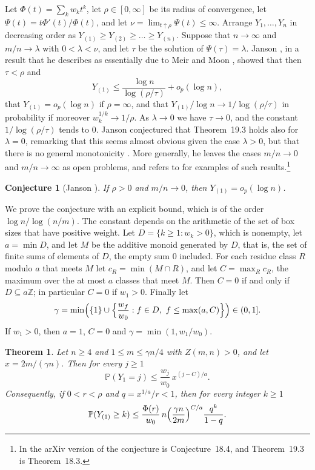 \documentclass[11pt]{amsart}
\newtheorem{theorem}{Theorem}[section]
\newtheorem*{conjecture*}{Conjecture}
\theoremstyle{remark}
\numberwithin{equation}{section}
\newcommand{\Pp}{\mathbb P}
\newcommand{\Z}{\mathbb Z}
\begin{document}
Let $\Phi(t)=\sum_kw_kt^k$, let $\rho\in[0,\infty]$ be its radius of convergence, let $\Psi(t)=t\Phi'(t)/\Phi(t)$, and let $\nu=\lim_{t\uparrow\rho}\Psi(t)\le\infty$. Arrange $Y_1,\dots,Y_n$ in decreasing order as $Y_{(1)}\ge Y_{(2)}\ge\dots\ge Y_{(n)}$. Suppose that $n\to\infty$ and $m/n\to\lambda$ with $0<\lambda<\nu$, and let $\tau$ be the solution of $\Psi(\tau)=\lambda$. Janson \cite[Theorem~19.3]{J12}, in a result that he describes as essentially due to Meir and Moon \cite{MM90}, showed that then $\tau<\rho$ and
\[
Y_{(1)}\le\frac{\log n}{\log(\rho/\tau)}+o_p(\log n),
\]
that $Y_{(1)}=o_p(\log n)$ if $\rho=\infty$, and that $Y_{(1)}/\log n\to1/\log(\rho/\tau)$ in probability if moreover $w_k^{1/k}\to1/\rho$. As $\lambda\to0$ we have $\tau\to0$, and the constant $1/\log(\rho/\tau)$ tends to $0$. Janson conjectured that Theorem~19.3 holds also for $\lambda=0$, remarking that this seems almost obvious given the case $\lambda>0$, but that there is no general monotonicity \cite[Section~19.1]{J12}. More generally, he leaves the cases $m/n\to0$ and $m/n\to\infty$ as open problems, and refers to \cite{KSC78,Kol86,Pav00,Kaz02} for examples of such results.\footnote{In the arXiv version of \cite{J12} the conjecture is Conjecture~18.4, and Theorem~19.3 is Theorem~18.3.}

\begin{conjecture*}[{Janson \cite[Conjecture~19.4]{J12}}]
If $\rho>0$ and $m/n\to0$, then $Y_{(1)}=o_p(\log n)$.
\end{conjecture*}

We prove the conjecture with an explicit bound, which is of the order $\log n/\log(n/m)$. The constant depends on the arithmetic of the set of box sizes that have positive weight. Let $D=\{k\ge1:w_k>0\}$, which is nonempty, let $a=\min D$, and let $M$ be the additive monoid generated by $D$, that is, the set of finite sums of elements of $D$, the empty sum $0$ included. For each residue class $R$ modulo $a$ that meets $M$ let $c_R=\min(M\cap R)$, and let $C=\max_Rc_R$, the maximum over the at most $a$ classes that meet $M$. Then $C=0$ if and only if $D\subseteq a\Z$; in particular $C=0$ if $w_1>0$. Finally let
\[
\gamma=\min\Bigl(\{1\}\cup\Bigl\{\frac{w_f}{w_0}:f\in D,\ f\le\max(a,C)\Bigr\}\Bigr)\in(0,1].
\]
If $w_1>0$, then $a=1$, $C=0$ and $\gamma=\min(1,w_1/w_0)$.

\begin{theorem}\label{thm:main}
Let $n\ge4$ and $1\le m\le\gamma n/4$ with $Z(m,n)>0$, and let $x=2m/(\gamma n)$. Then for every $j\ge1$
\begin{equation}\label{eq:point}
\Pp(Y_1=j)\le\frac{w_j}{w_0}\,x^{(j-C)/a}.
\end{equation}
Consequently, if $0<r<\rho$ and $q=x^{1/a}/r<1$, then for every integer $k\ge1$
\begin{equation}\label{eq:tail}
\Pp(Y_{(1)}\ge k)\le\frac{\Phi(r)}{w_0}\,n\Bigl(\frac{\gamma n}{2m}\Bigr)^{C/a}\frac{q^k}{1-q}.
\end{equation}
\end{theorem}
\end{document}
